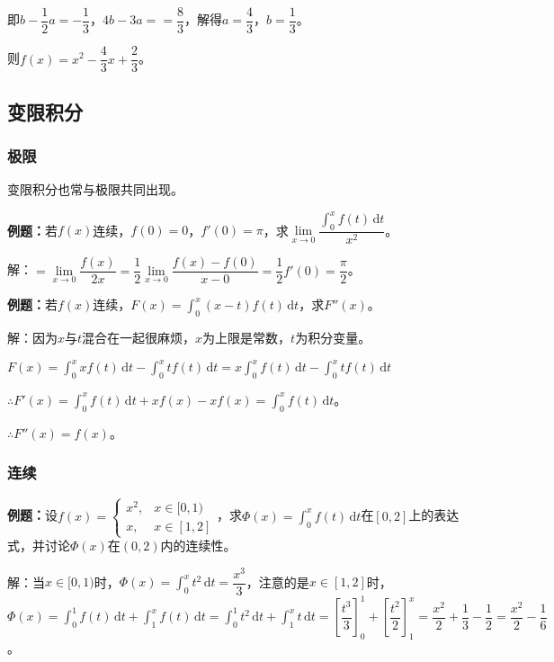 \documentclass[UTF8, 12pt]{ctexart}
\begin{document}
即$b-\dfrac{1}{2}a=-\dfrac{1}{3}$，$4b-3a==\dfrac{8}{3}$，解得$a=\dfrac{4}{3}$，$b=\dfrac{1}{3}$。

则$f(x)=x^2-\dfrac{4}{3}x+\dfrac{2}{3}$。

\subsection{变限积分}

\subsubsection{极限}

变限积分也常与极限共同出现。

\textbf{例题：}若$f(x)$连续，$f(0)=0$，$f'(0)=\pi$，求$\lim\limits_{x\to0}\dfrac{\int_0^xf(t)\,\textrm{d}t}{x^2}$。

解：$=\lim\limits_{x\to0}\dfrac{f(x)}{2x}=\dfrac{1}{2}\lim\limits_{x\to0}\dfrac{f(x)-f(0)}{x-0}=\dfrac{1}{2}f'(0)=\dfrac{\pi}{2}$。

\textbf{例题：}若$f(x)$连续，$F(x)=\int_0^x(x-t)f(t)\,\textrm{d}t$，求$F''(x)$。

解：因为$x$与$t$混合在一起很麻烦，$x$为上限是常数，$t$为积分变量。

$F(x)=\int_0^xxf(t)\,\textrm{d}t-\int_0^xtf(t)\,\textrm{d}t=x\int_0^xf(t)\,\textrm{d}t-\int_0^xtf(t)\,\textrm{d}t$

$\therefore F'(x)=\int_0^xf(t)\,\textrm{d}t+xf(x)-xf(x)=\int_0^xf(t)\,\textrm{d}t$。

$\therefore F''(x)=f(x)$。

\subsubsection{连续}

\textbf{例题：}设$f(x)=\left\{\begin{array}{ll}
    x^2, & x\in[0,1) \\
    x, & x\in[1,2]
\end{array}\right.$，求$\varPhi(x)=\int_0^xf(t)\,\textrm{d}t$在$[0,2]$上的表达式，并讨论$\varPhi(x)$在$(0,2)$内的连续性。

解：当$x\in[0,1)$时，$\varPhi(x)=\int_0^xt^2\,\textrm{d}t=\dfrac{x^3}{3}$，注意的是$x\in[1,2]$时，$\varPhi(x)=\int_0^1f(t)\,\textrm{d}t+\int_1^xf(t)\,\textrm{d}t=\int_0^1t^2\,\textrm{d}t+\int_1^xt\,\textrm{d}t=\left[\dfrac{t^3}{3}\right]_0^1+\left[\dfrac{t^2}{2}\right]_1^x=\dfrac{x^2}{2}+\dfrac{1}{3}-\dfrac{1}{2}=\dfrac{x^2}{2}-\dfrac{1}{6}$。
\end{document}
